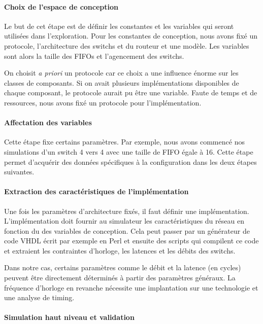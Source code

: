 \paragraph{Choix de l'espace de conception}

Le but de cet étape est de définir les constantes et les variables qui seront
utilisées dans l'exploration. Pour les constantes de conception, nous avons fixé
un protocole, l'architecture des switchs et du routeur et une modèle. Les
variables sont alors la taille des FIFOs et l'agencement des switchs.

On choisit \textit{a priori} un protocole car ce choix a une influence énorme
sur les classes de composants. Si on avait plusieurs implémentations disponibles
de chaque composant, le protocole aurait pu être une variable. Faute de temps et
de ressources, nous avons fixé un protocole pour l'implémentation.

\paragraph{Affectation des variables}

Cette étape fixe certains paramètres. Par exemple, nous avons commencé nos
simulations d'un switch 4 vers 4 avec une taille de FIFO égale à 16. Cette étape
permet d'acquérir des données spécifiques à la configuration dans les deux
étapes suivantes.

\paragraph{Extraction des caractéristiques de l'implémentation}

Une fois les paramètres d'architecture fixés, il faut définir une
implémentation. L'implémentation doit fournir au simulateur les caractéristiques
du réseau en fonction du des variables de conception. Cela peut passer par un
générateur de code VHDL écrit par exemple en Perl et ensuite des scripts qui
compilent ce code et extraient les contraintes d'horloge, les latences et les
débits des switchs.

Dans notre cas, certains paramètres comme le débit et la latence (en cycles)
peuvent être directement déterminés à partir des paramètres généraux. La
fréquence d'horloge en revanche nécessite une implantation sur une technologie
et une analyse de timing.

\paragraph{Simulation haut niveau et validation}

